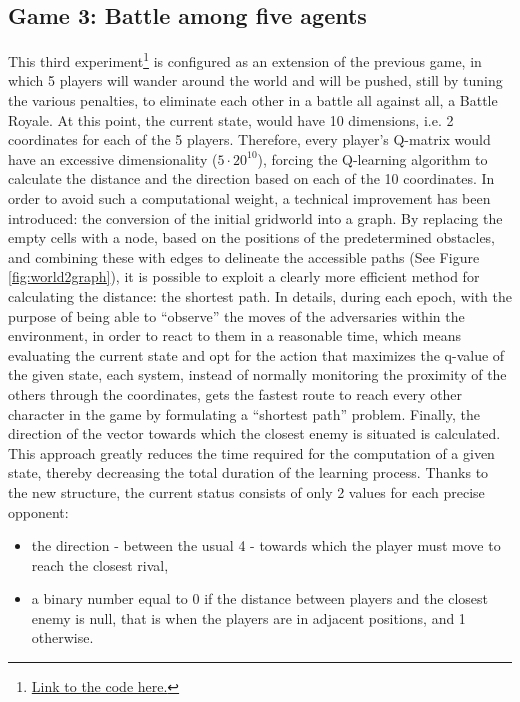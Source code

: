 \subsection{Game 3: Battle among five agents}
This third experiment\footnote{\href{https://github.com/moiraghif/DragonHunting/tree/master/Duel_2}{Link to the code here.}} is configured as an extension of the previous game, in which 5 players will wander around the world and will be pushed, still by tuning the various penalties, to eliminate each other in a battle all against all, a Battle Royale. 
At this point, the current state, would have 10 dimensions, i.e. 2 coordinates for each of the 5 players. Therefore, every player's Q-matrix would have an excessive dimensionality ($5\cdot20^{10}$), forcing the Q-learning algorithm to calculate the distance and the direction based on each of the 10 coordinates. 
In order to avoid such a computational weight, a technical improvement has been introduced: the conversion of the initial gridworld into a graph. 
By replacing the empty cells with a node, based on the positions of the predetermined obstacles, and combining these with edges to delineate the accessible paths (See Figure \ref{fig:world2graph}), it is possible to exploit a clearly more efficient method for calculating the distance: the shortest path. 
In details, during each epoch, with the purpose of being able to ``observe'' the moves of the adversaries within the environment, in order to react to them in a reasonable time, which means evaluating the current state and opt for the action that maximizes the q-value of the given state, each system, instead of normally monitoring the proximity of the others through the coordinates, gets the fastest route to reach every other character in the game by formulating a ``shortest path'' problem. 
Finally, the direction of the vector towards which the closest enemy is situated is calculated. 
This approach greatly reduces the time required for the computation of a given state, thereby decreasing the total duration of the learning process. Thanks to the new structure, the current status consists of only 2 values for each precise opponent:
\begin{itemize}[noitemsep, topsep=0ex]
  \item the direction - between the usual 4 - towards which the player must move to reach the closest rival,
  \item a binary number equal to 0 if the distance between players and the closest enemy is null, that is when the players are in adjacent positions, and 1 otherwise.
\end{itemize}

